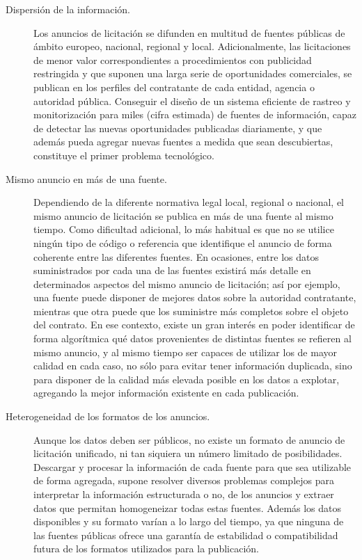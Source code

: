 \documentclass[a4paper,twoside,12pt]{report}
\begin{document}
\begin{description}
 \item  [Dispersión de la información.] Los anuncios de licitación se difunden en multitud de fuentes
públicas de ámbito europeo, nacional, regional y local. Adicionalmente, las licitaciones de menor
valor correspondientes a procedimientos con publicidad restringida y que suponen una larga
serie de oportunidades comerciales, se publican en los perfiles del contratante de cada
entidad, agencia o autoridad pública. Conseguir el diseño de un sistema eficiente de rastreo y
monitorización para miles (cifra estimada) de fuentes de información, capaz de detectar las
nuevas oportunidades publicadas diariamente, y que además pueda agregar nuevas fuentes a
medida que sean descubiertas, constituye el primer problema tecnológico.

\item [Mismo anuncio en más de una fuente.] Dependiendo de la diferente normativa legal local,
regional o nacional, el mismo anuncio de licitación se publica en más de una fuente al
mismo tiempo. Como dificultad adicional, lo más habitual es que no se utilice ningún tipo de
código o referencia que identifique el anuncio de forma coherente entre las diferentes
fuentes. En ocasiones, entre los datos suministrados por cada una de las fuentes existirá más
detalle en determinados aspectos del mismo anuncio de licitación; así por ejemplo, una fuente
puede disponer de mejores datos sobre la autoridad contratante, mientras que otra puede que los suministre
más completos sobre el objeto del contrato. En ese contexto, existe un gran interés en poder
identificar de forma algorítmica qué datos provenientes de distintas fuentes se refieren al
mismo anuncio, y al mismo tiempo ser capaces de utilizar los de mayor calidad en cada caso,
no sólo para evitar tener información duplicada, sino para disponer de la calidad más elevada posible
en los datos a explotar, agregando la mejor información existente en cada publicación.

\item [Heterogeneidad de los formatos de los anuncios.] Aunque los datos deben ser públicos, no
existe un formato de anuncio de licitación unificado, ni tan siquiera un número limitado de
posibilidades. Descargar y procesar la información de cada fuente para que sea utilizable de
forma agregada, supone resolver diversos problemas complejos para interpretar la información
estructurada o no, de los anuncios y extraer datos que permitan
homogeneizar todas estas fuentes. Además los datos disponibles y su formato varían a lo largo
del tiempo, ya que ninguna de las fuentes públicas ofrece una garantía de estabilidad o
compatibilidad futura de los formatos utilizados para la publicación.


\end{description}
\end{document}
